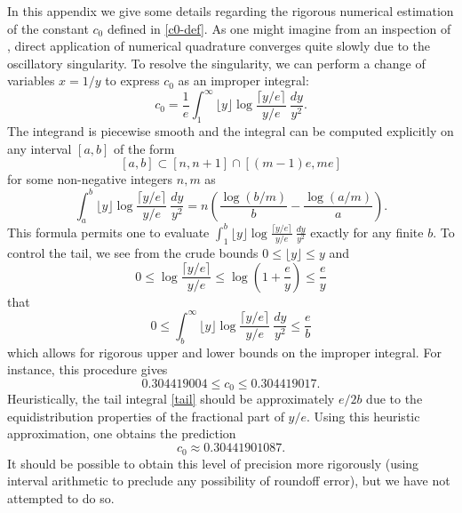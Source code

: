 \documentclass[12pt,a4paper,reqno]{amsart}
\numberwithin{equation}{section}
\theoremstyle{plain}
\theoremstyle{definition}
\begin{document}
In this appendix we give some details regarding the rigorous numerical estimation of the constant $c_0$ defined in \eqref{c0-def}.  As one might imagine from an inspection of , direct application of numerical quadrature converges quite slowly due to the oscillatory singularity.  To resolve the singularity, we can perform a change of variables $x=1/y$ to express $c_0$ as an improper integral:
\begin{equation}\label{c0-alt}
   c_0 = \frac{1}{e} \int_1^\infty \lfloor y \rfloor \log \frac{\lceil y/e \rceil}{y/e}\ \frac{dy}{y^2}.
\end{equation}
The integrand is piecewise smooth and the integral can be computed explicitly on any interval $[a,b]$ of the form
$$ [a,b] \subset [n, n+1] \cap [(m-1)e, me]$$
for some non-negative integers $n,m$ as
$$ \int_a^b \lfloor y \rfloor \log \frac{\lceil y/e \rceil}{y/e}\ \frac{dy}{y^2} = n \left(\frac{\log(b/m)}{b} - \frac{\log(a/m)}{a}\right).$$
This formula permits one to evaluate $\int_1^b \lfloor y \rfloor \log \frac{\lceil y/e \rceil}{y/e}\ \frac{dy}{y^2}$ exactly for any finite $b$.  To control the tail, we see from the crude bounds $0 \leq \lfloor y \rfloor \leq y$ and
$$ 0 \leq \log \frac{\lceil y/e \rceil}{y/e} \leq \log 
\left(1 + \frac{e}{y}\right) \leq \frac{e}{y}
$$
that
\begin{equation}\label{tail}
   0 \leq \int_b^\infty \lfloor y \rfloor \log \frac{\lceil y/e \rceil}{y/e}\ \frac{dy}{y^2} \leq \frac{e}{b}
\end{equation}
which allows for rigorous upper and lower bounds on the improper integral.  For instance, this procedure gives
$$ 0.304419004 \leq c_0 \leq 0.304419017.$$
Heuristically, the tail integral \eqref{tail} should be approximately $e/2b$ due to the equidistribution properties of the fractional part of $y/e$.  Using this heuristic approximation, one obtains the prediction
$$ c_0 \approx 0.30441901087.$$
It should be possible to obtain this level of precision more rigorously (using interval arithmetic to preclude any possibility of roundoff error), but we have not attempted to do so.
\end{document}
